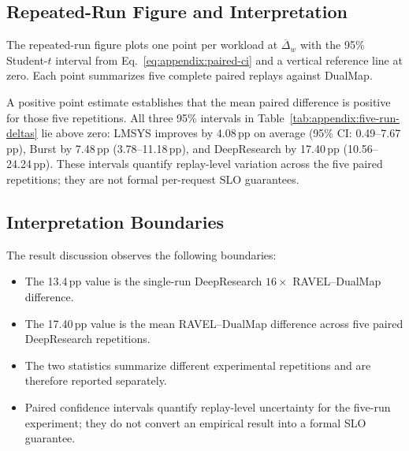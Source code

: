 \subsection{Repeated-Run Figure and Interpretation}
\label{sec:appendix:repeated-run-figure}

The repeated-run figure plots one point per workload at
$\overline{\Delta}_w$ with the 95\% Student-$t$ interval from
Eq.~\ref{eq:appendix:paired-ci} and a vertical reference line at zero.
Each point summarizes five complete paired replays against DualMap.

A positive point estimate establishes that the mean paired difference is
positive for those five repetitions.  All three 95\% intervals in
Table~\ref{tab:appendix:five-run-deltas} lie above zero: LMSYS improves by
4.08\,pp on average (95\% CI: 0.49--7.67\,pp), Burst by 7.48\,pp
(3.78--11.18\,pp), and DeepResearch by 17.40\,pp
(10.56--24.24\,pp).  These intervals quantify replay-level variation across
the five paired repetitions; they are not formal per-request SLO guarantees.



\subsection{Interpretation Boundaries}
\label{sec:appendix:result-boundaries}

The result discussion observes the following boundaries:

\begin{itemize}
    \item The 13.4\,pp value is the single-run DeepResearch $16\times$
          RAVEL--DualMap difference.
    \item The 17.40\,pp value is the mean RAVEL--DualMap difference
          across five paired DeepResearch repetitions.
    \item The two statistics summarize different experimental repetitions and
          are therefore reported separately.
    \item Paired confidence intervals quantify replay-level uncertainty for
          the five-run experiment; they do not convert an empirical result
          into a formal SLO guarantee.
\end{itemize}









